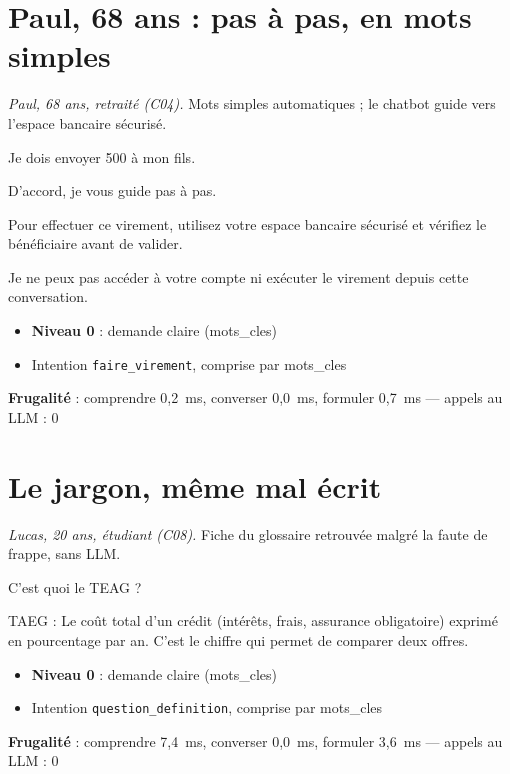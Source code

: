 \documentclass[11pt,a4paper]{article}
\newcommand{\frugal}[1]{{\scriptsize\color{darkgray}\textbf{Frugalité} : #1}\par\medskip}
\begin{document}
\section{Paul, 68 ans : pas à pas, en mots simples}
\textit{Paul, 68 ans, retraité (C04).} Mots simples automatiques ; le chatbot guide vers l'espace bancaire sécurisé.

\begin{client}Je dois envoyer 500 \texteuro{} à mon fils.\end{client}
\begin{assistant}D'accord, je vous guide pas à pas.\par Pour effectuer ce virement, utilisez votre espace bancaire sécurisé et vérifiez le bénéficiaire avant de valider.\par Je ne peux pas accéder à votre compte ni exécuter le virement depuis cette conversation.\end{assistant}
\begin{pourquoi}
\begin{itemize}
\item \textbf{Niveau 0} : demande claire (mots\_cles)
\item Intention \texttt{faire\_virement}, comprise par mots\_cles
\end{itemize}
\end{pourquoi}
\frugal{comprendre 0,2~ms, converser 0,0~ms, formuler 0,7~ms --- appels au LLM : 0}

\section{Le jargon, même mal écrit}
\textit{Lucas, 20 ans, étudiant (C08).} Fiche du glossaire retrouvée malgré la faute de frappe, sans LLM.

\begin{client}C'est quoi le TEAG ?\end{client}
\begin{assistant}TAEG : Le coût total d'un crédit (intérêts, frais, assurance obligatoire) exprimé en pourcentage par an. C'est le chiffre qui permet de comparer deux offres.\end{assistant}
\begin{pourquoi}
\begin{itemize}
\item \textbf{Niveau 0} : demande claire (mots\_cles)
\item Intention \texttt{question\_definition}, comprise par mots\_cles
\end{itemize}
\end{pourquoi}
\frugal{comprendre 7,4~ms, converser 0,0~ms, formuler 3,6~ms --- appels au LLM : 0}
\end{document}
